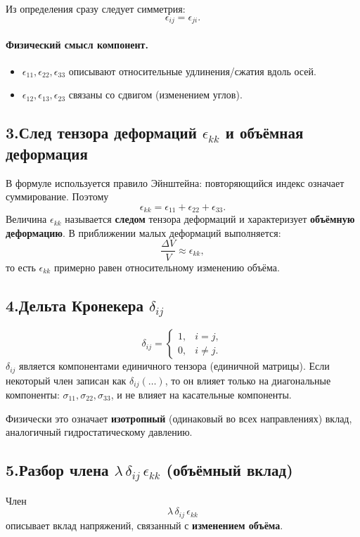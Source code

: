 Из определения сразу следует симметрия:
\[
\epsilon_{ij}=\epsilon_{ji}.
\]

\paragraph{Физический смысл компонент.}
\begin{itemize}
\item $\epsilon_{11},\epsilon_{22},\epsilon_{33}$ описывают относительные удлинения/сжатия вдоль осей.
\item $\epsilon_{12},\epsilon_{13},\epsilon_{23}$ связаны со сдвигом (изменением углов).
\end{itemize}

\subsection*{3.\;След тензора деформаций $\epsilon_{kk}$ и объёмная деформация}
В формуле используется правило Эйнштейна: повторяющийся индекс означает суммирование.
Поэтому
\begin{equation}
\epsilon_{kk}=\epsilon_{11}+\epsilon_{22}+\epsilon_{33}.
\end{equation}
Величина $\epsilon_{kk}$ называется \textbf{следом} тензора деформаций и характеризует \textbf{объёмную деформацию}.
В приближении малых деформаций выполняется:
\[
\frac{\Delta V}{V}\approx \epsilon_{kk},
\]
то есть $\epsilon_{kk}$ примерно равен относительному изменению объёма.

\subsection*{4.\;Дельта Кронекера $\delta_{ij}$}
\[
\delta_{ij}=
\begin{cases}
1, & i=j,\\
0, & i\neq j.
\end{cases}
\]
$\delta_{ij}$ является компонентами единичного тензора (единичной матрицы).
Если некоторый член записан как $\delta_{ij}(\dots)$, то он влияет только на диагональные компоненты:
$\sigma_{11},\sigma_{22},\sigma_{33}$, и не влияет на касательные компоненты.

Физически это означает \textbf{изотропный} (одинаковый во всех направлениях) вклад,
аналогичный гидростатическому давлению.

\subsection*{5.\;Разбор члена $\lambda\,\delta_{ij}\,\epsilon_{kk}$ (объёмный вклад)}
Член
\[
\lambda\,\delta_{ij}\,\epsilon_{kk}
\]
описывает вклад напряжений, связанный с \textbf{изменением объёма}.

